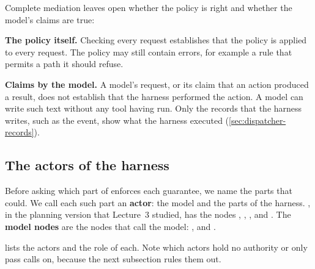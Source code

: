 Complete mediation leaves open whether the policy is right and whether the model's claims are
true:
\bi
\item \textbf{The policy itself.} Checking every request establishes that the policy is applied to
every request. The policy may still contain errors, for example a rule that permits a path it
should refuse.
\item \textbf{Claims by the model.} A model's request, or its claim that an action produced a
result, does not establish that the harness performed the action. A model can write such text
without any tool having run. Only the records that the harness writes, such as the
 event, show what the harness executed (\cref{sec:dispatcher-records}).
\ei

\subsection{The actors of the harness}
\label{sec:dispatcher-actors}

Before asking which part of \msa{} enforces each guarantee, we name the parts that could. We call each such part an \textbf{actor}: the model and the parts of the harness.
\msa{}, in the planning version that Lecture~3 studied, has the nodes ,
, ,  and . The \textbf{model
nodes} are the nodes that call the model: ,  and
.

 lists the actors and the role of each. Note which actors hold no
authority or only pass calls on, because the next subsection rules them out.

